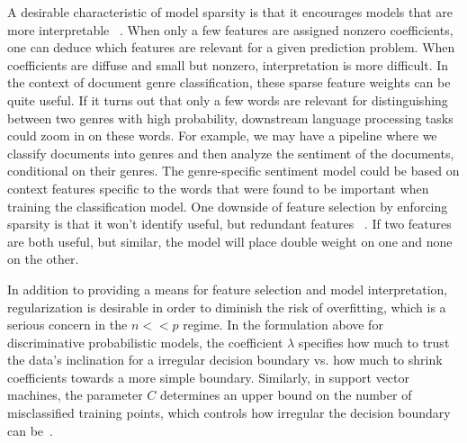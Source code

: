 \documentclass[]{article}
\begin{document}
	A desirable characteristic of model sparsity is that it encourages models that are more interpretable  ~\cite{tibshirani1996regression}. When only a few features are assigned nonzero coefficients, one can deduce which features are relevant for a given prediction problem. When coefficients are diffuse and small but nonzero, interpretation is more difficult. In the context of document genre classification, these sparse feature weights can be quite useful. If it turns out that only a few words are relevant for distinguishing between two genres with high probability, downstream language processing tasks could zoom in on these words. For example, we may have a pipeline where we classify documents into genres and then analyze the sentiment of the documents, conditional on their genres. The genre-specific sentiment model could be based on context features specific to the words that were found to be important when training the classification model. One downside of feature selection by enforcing sparsity is that it won't identify useful, but redundant features ~\cite{LectureL1}. If two features are both useful, but similar, the model will place double weight on one and none on the other. 

	In addition to providing a means for feature selection and model interpretation, regularization is desirable in order to diminish the risk of overfitting, which is a serious concern in the $n << p$ regime. In the formulation above for discriminative probabilistic models, the coefficient $\lambda$ specifies how much to trust the data's inclination for a irregular decision boundary vs. how much to shrink coefficients towards a more simple boundary. Similarly, in support vector machines, the parameter $C$ determines an upper bound on the number of misclassified training points, which controls how irregular the decision boundary can be~\cite[332]{Bishop}.
\end{document}
